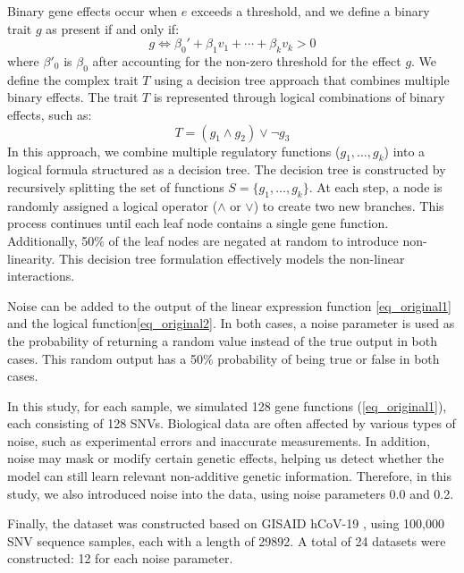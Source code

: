 \documentclass{article}
\begin{document}
Binary gene effects occur when \( e \) exceeds a threshold, and we define a binary trait \( g \) as present if and only if:
\begin{equation}
g \iff \beta_0' + \beta_1 v_1 + \cdots + \beta_k v_k > 0
\label{eq_original1}
\end{equation}
where $\beta'_0$ is $\beta_0$ after accounting for the non-zero threshold for the effect $g$.
We define the complex trait \( T \) using a decision tree approach that combines multiple binary effects. The trait \( T \) is represented through logical combinations of binary effects, such as:
\begin{equation}
T = (g_1 \land g_2) \lor \neg g_3
\label{eq_original2}
\end{equation}
In this approach, we combine multiple regulatory functions ($g_1, \dots, g_k$) into a logical formula structured as a decision tree. The decision tree is constructed by recursively splitting the set of functions $S = \{g_1, \dots, g_k\}$. At each step, a node is randomly assigned a logical operator ($\land$ or $\lor$) to create two new branches. This process continues until each leaf node contains a single gene function. Additionally, 50\% of the leaf nodes are negated at random to introduce non-linearity. This decision tree formulation effectively models the non-linear interactions.

Noise can be added to the output of the linear expression function \eqref{eq_original1} and the logical function\eqref{eq_original2}. In both cases, a noise parameter is used as the probability of returning a random value instead of the true output in both cases. This random output has a 50\% probability of being true or false in both cases. 

In this study, for each sample, we simulated 128 gene functions (\eqref{eq_original1}), each consisting of 128 SNVs. Biological data are often affected by various types of noise, such as experimental errors and inaccurate measurements. In addition, noise may mask or modify certain genetic effects, helping us detect whether the model can still learn relevant non-additive genetic information. Therefore, in this study, we also introduced noise into the data, using noise parameters 0.0 and 0.2.

Finally, the dataset was constructed based on GISAID hCoV-19 \parencite{elbe2017data}, using 100,000 SNV sequence samples, each with a length of 29892. A total of 24 datasets were constructed: 12 for each noise parameter.
\end{document}
